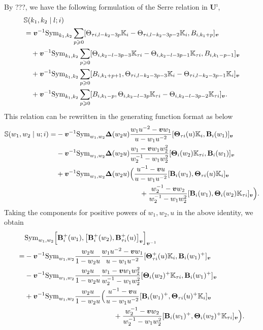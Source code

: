 \documentclass[11pt,reqno]{amsart}
\numberwithin{equation}{section}
\theoremstyle{definition}
\theoremstyle{remark}
\newcommand{\bB}{\mathbb{B}}
\newcommand{\gge}{\geqslant}
\newcommand{\Sym}{{\mathrm{Sym}}}
\def \bTH { \boldsymbol{\Theta}}
\def \bDel{ \boldsymbol{\Delta}}
\def \bB{\mathbf{B}}
\def \TH{\Theta}
\def \TH{\Theta}
\def \Sym{\mathrm{Sym}}
\def \tUi{\mathbf{U}^\imath}
\def \K{\mathbb{K}}
\begin{document}
By ???, we have the following formulation of the Serre relation in $\tUi$,
\begin{align*}
&\mathbb{S}(k_1,k_2\mid l;i )\\
	&= \bm{v}^{-1}\Sym_{k_1,k_2}\sum_{p\gge 0}[\TH_{\tau i,l-k_2-3p }\K_i -\TH_{\tau i,l-k_2-3p-2}\K_i ,B_{i,k_1+p} ]_{\bm{v}} 
	\notag \\
	&\quad +{\bm{v}}^{-1}\Sym_{k_1,k_2}\sum_{p\gge 0}[ \TH_{  i,k_2- l-3p-3}\K_{\tau i}  -\TH_{  i,k_2 -l-3p-1}\K_{\tau i},B_{i,k_1-p-1} ]_{\bm{v}} 
	\notag \\
	&\quad +{\bm{v}}^{-1}\Sym_{k_1,k_2}\sum_{p\gge 0}[B_{i,k_1+p+1}, \TH_{\tau i,l-k_2-3p-3}\K_i  -\TH_{\tau i,l- k_2 -3p-1}\K_i ]_{\bm{v}} 
	\notag \\
	&\quad +{\bm{v}}^{-1}\Sym_{k_1,k_2}\sum_{p\gge 0}[B_{i,k_1-p }, \TH_{i,k_2- l-3p }\K_{\tau i} -\TH_{i, k_2-l-3p-2}\K_{\tau i} ]_{\bm{v}} .
\end{align*}
This relation can be rewritten in the generating function format as below
\begin{align*}\notag
\mathbb{S}(w_1,w_2\mid u;i) 
   =&-{\bm{v}}^{-1}\Sym_{w_1,w_2}\bDel(w_2 u)\frac{w_1 u^{-2}-{\bm{v}}w_1}{u-  w_1 u^{-2}}[\bTH_{\tau i}(u)\K_i,\bB_i(w_1)]_{\bm{v}} \\  
    &-{\bm{v}}^{-1}\Sym_{w_1,w_2}\bDel(w_2 u)\frac{w_1-{\bm{v}} w_1 w_2^2}{w_2^{-1}-  w_1 w_2^2 }[\bTH_i(w_2)\K_{\tau i},\bB_i(w_1)]_{\bm{v}}\\
    &+{\bm{v}}^{-1}\Sym_{w_1,w_2}\bDel(w_2 u)\Big(\frac{u^{-1}-{\bm{v}}u}{u-  w_1 u^{-2}}[\bB_i(w_1),\bTH_{\tau i}(u)\K_i]_{\bm{v}} \\
    &\hskip4.2cm + \frac{ w_2^{-1}-{\bm{v}} w_2}{w_2^{-1}-  w_1 w_2^2 }[\bB_i(w_1),\bTH_i(w_2)\K_{\tau i}]_{\bm{v}}\Big).\notag
   \end{align*}
Taking the components for positive powers of $w_1,w_2,u$ in the above identity, we obtain
\begin{align*}\notag
   &\Sym_{w_1,w_2}\Big[ \bB^+_{i}(w_1),\big[\bB^+_{i}(w_2),\bB_{\tau i}^+(u)\big]_{\bm v} \Big]_{\bm v^{-1}}
\\\notag
   =&-{\bm{v}}^{-1}\Sym_{w_1,w_2}\frac{w_2 u}{1-w_2u}\frac{w_1 u^{-2}-{\bm{v}}w_1}{u-  w_1 u^{-2}}[\bTH_{\tau i}^+(u)\K_i,\bB_i(w_1)^+]_{\bm{v}} \\  
    &-{\bm{v}}^{-1}\Sym_{w_1,w_2}\frac{w_2 u}{1-w_2u}\frac{w_1-{\bm{v}} w_1 w_2^2}{w_2^{-1}-  w_1 w_2^2 }[\bTH_i(w_2)^+\K_{\tau i},\bB_i(w_1)^+]_{\bm{v}}\\
    &+{\bm{v}}^{-1}\Sym_{w_1,w_2}\frac{w_2 u}{1-w_2u}\Big(\frac{u^{-1}-{\bm{v}}u}{u-  w_1 u^{-2}}[\bB_i(w_1)^+,\bTH_{\tau i}(u)^+\K_i]_{\bm{v}}\\
    &\hskip 4.4cm + \frac{ w_2^{-1}-{\bm{v}} w_2}{w_2^{-1}-  w_1 w_2^2 }[\bB_i(w_1)^+,\bTH_i(w_2)^+\K_{\tau i}]_{\bm{v}}\Big).\notag
   \end{align*}
\end{document}
